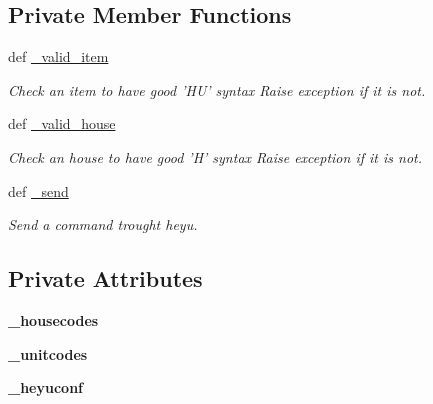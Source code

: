 \subsection*{Private Member Functions}
\begin{CompactItemize}
\item 
\hypertarget{classx10API_1_1X10API_398d98e0674a6cefaef1154eafe94a15}{
def \hyperlink{classx10API_1_1X10API_398d98e0674a6cefaef1154eafe94a15}{\_\-valid\_\-item}}
\label{classx10API_1_1X10API_398d98e0674a6cefaef1154eafe94a15}

\begin{CompactList}\small\item\em Check an item to have good 'HU' syntax Raise exception if it is not. \item\end{CompactList}\item 
\hypertarget{classx10API_1_1X10API_e9639dcec52e0f507fcc224a6c377c7d}{
def \hyperlink{classx10API_1_1X10API_e9639dcec52e0f507fcc224a6c377c7d}{\_\-valid\_\-house}}
\label{classx10API_1_1X10API_e9639dcec52e0f507fcc224a6c377c7d}

\begin{CompactList}\small\item\em Check an house to have good 'H' syntax Raise exception if it is not. \item\end{CompactList}\item 
def \hyperlink{classx10API_1_1X10API_268f590bc14835490b1ea823c86e4dcb}{\_\-send}
\begin{CompactList}\small\item\em Send a command trought heyu. \item\end{CompactList}\end{CompactItemize}
\subsection*{Private Attributes}
\begin{CompactItemize}
\item 
\hypertarget{classx10API_1_1X10API_e2bc653247758e1a67d8b8ac5b0d3611}{
\textbf{\_\-housecodes}}
\label{classx10API_1_1X10API_e2bc653247758e1a67d8b8ac5b0d3611}

\item 
\hypertarget{classx10API_1_1X10API_d2d5e02d43d6d4d1b0eba44248d29bb5}{
\textbf{\_\-unitcodes}}
\label{classx10API_1_1X10API_d2d5e02d43d6d4d1b0eba44248d29bb5}

\item 
\hypertarget{classx10API_1_1X10API_e11abda6663c0ad8d5e63d6abd52d562}{
\textbf{\_\-heyuconf}}
\label{classx10API_1_1X10API_e11abda6663c0ad8d5e63d6abd52d562}

\end{CompactItemize}


